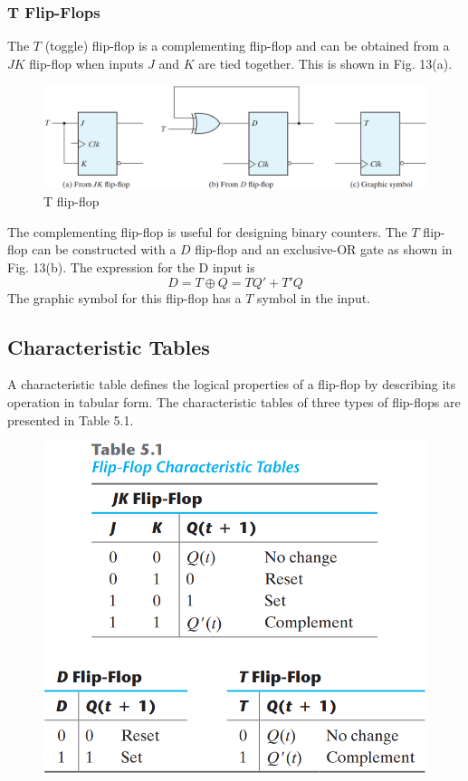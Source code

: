 \subsubsection{T Flip-Flops}
\label{subsubsec:t-flip-flops}

The $T$ (toggle) flip-flop is a complementing flip-flop and can be obtained from a $JK$ flip-flop when inputs $J$ and $K$ are tied together. This is shown in Fig. 13(a).
\begin{figure}[H]
  \centering
  \includegraphics[width=\linewidth]{img/fig-5.13.png}
  \caption{T flip-flop}
  \label{fig:5.13}
\end{figure}
The complementing flip-flop is useful for designing binary counters. The $T$ flip-flop can be constructed with a $D$ flip-flop and an exclusive-OR gate as shown in Fig. 13(b). The expression for the D input is
\begin{equation*}
  D = T \oplus Q = TQ' + T'Q
\end{equation*}
The graphic symbol for this flip-flop has a $T$ symbol in the input.


\subsection{Characteristic Tables}
\label{subsec:char-tables}

A characteristic table defines the logical properties of a flip-flop by describing its operation in tabular form. The characteristic tables of three types of flip-flops are presented in Table 5.1.
\begin{figure}[H]
  \centering
  \includegraphics[width=\linewidth]{img/table-5.1.png}
  \label{table:5.1}
\end{figure}


